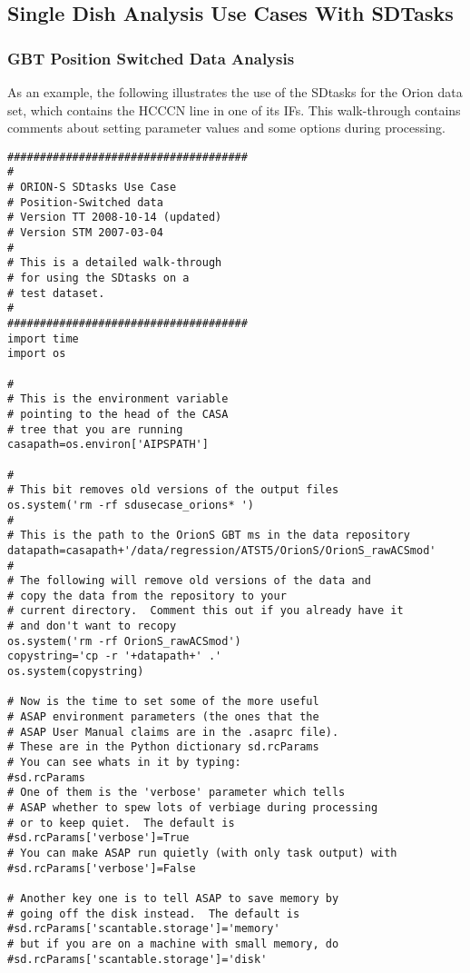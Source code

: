 \subsection{Single Dish Analysis Use Cases With SDTasks}
\label{section:sd.sdtasks.usecase}

\subsubsection{GBT Position Switched Data Analysis}
As an example, the following illustrates the use of the SDtasks for
the Orion data set, which contains the HCCCN line in one of its IFs.
This walk-through contains comments about setting parameter values
and some options during processing.

\begin{verbatim}
#####################################
#
# ORION-S SDtasks Use Case
# Position-Switched data
# Version TT 2008-10-14 (updated)
# Version STM 2007-03-04
#
# This is a detailed walk-through
# for using the SDtasks on a
# test dataset.
#
#####################################
import time
import os

#
# This is the environment variable
# pointing to the head of the CASA
# tree that you are running
casapath=os.environ['AIPSPATH']

#
# This bit removes old versions of the output files
os.system('rm -rf sdusecase_orions* ')
#
# This is the path to the OrionS GBT ms in the data repository
datapath=casapath+'/data/regression/ATST5/OrionS/OrionS_rawACSmod'
#
# The following will remove old versions of the data and
# copy the data from the repository to your
# current directory.  Comment this out if you already have it
# and don't want to recopy
os.system('rm -rf OrionS_rawACSmod')
copystring='cp -r '+datapath+' .'
os.system(copystring)

# Now is the time to set some of the more useful
# ASAP environment parameters (the ones that the
# ASAP User Manual claims are in the .asaprc file).
# These are in the Python dictionary sd.rcParams
# You can see whats in it by typing:
#sd.rcParams
# One of them is the 'verbose' parameter which tells
# ASAP whether to spew lots of verbiage during processing
# or to keep quiet.  The default is
#sd.rcParams['verbose']=True
# You can make ASAP run quietly (with only task output) with
#sd.rcParams['verbose']=False

# Another key one is to tell ASAP to save memory by
# going off the disk instead.  The default is
#sd.rcParams['scantable.storage']='memory'
# but if you are on a machine with small memory, do
#sd.rcParams['scantable.storage']='disk'


\end{verbatim}
